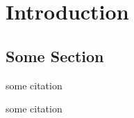 
\chapter{Introduction}
\label{ch:Introduction}

\section{Some Section}
\label{sec:SomeSection}

some citation\cite{test1}

some citation\cite{test2}

\endinput

Any text after an \endinput is ignored.
You could put scraps here or things in progress.

